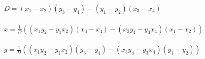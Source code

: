 \begin{huge}
  $\displaystyle D = (x_1 - x_2)(y_3 - y_4) - (y_1 - y_2)(x_3 - x_4)$ \\
  \\
  $\displaystyle x = \tfrac{1}{D} ((x_1y_2 - y_1x_2)(x_3 - x_4) - (x_3y_4 - y_3x_4)(x_1 - x_2))$ \\
  \\
  $\displaystyle y = \tfrac{1}{D} ((x_1y_2 - y_1x_2)(y_3 - y_4) - (x_3y_4 - y_3x_4)(y_1 - y_2))$
\end{huge}
